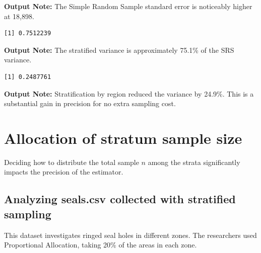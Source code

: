 \documentclass[
  letterpaper,
  DIV=11,
  numbers=noendperiod]{scrreprt}
\renewcommand{\[}{\begin{equation}}
\renewcommand{\]}{\end{equation}}
\begin{document}
\textbf{Output Note:} The Simple Random Sample standard error is
noticeably higher at 18,898.

\begin{verbatim}
[1] 0.7512239
\end{verbatim}

\textbf{Output Note:} The stratified variance is approximately 75.1\% of
the SRS variance.

\begin{verbatim}
[1] 0.2487761
\end{verbatim}

\textbf{Output Note:} Stratification by region reduced the variance by
24.9\%. This is a substantial gain in precision for no extra sampling
cost.

\section{Allocation of stratum sample
size}\label{allocation-of-stratum-sample-size}

Deciding how to distribute the total sample \(n\) among the strata
significantly impacts the precision of the estimator.

\subsection{Analyzing seals.csv collected with stratified
sampling}\label{analyzing-seals.csv-collected-with-stratified-sampling}

This dataset investigates ringed seal holes in different zones. The
researchers used Proportional Allocation, taking 20\% of the areas in
each zone.
\end{document}
